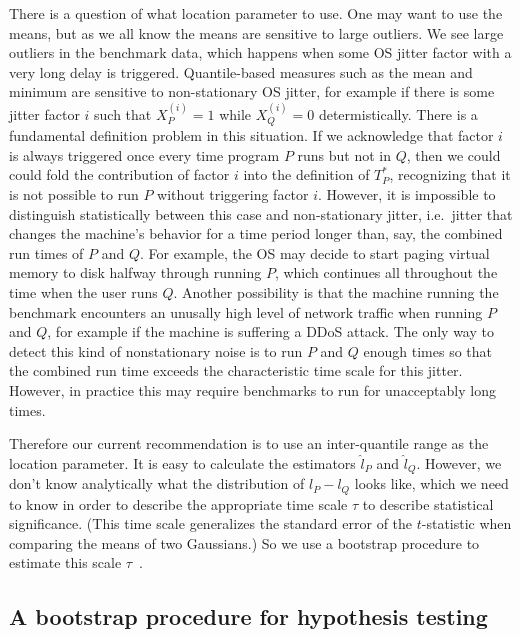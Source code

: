\documentclass[conference]{IEEEtran}
\begin{document}
There is a question of what location parameter to use.
One may want to use the means, but as we all know the means are sensitive to large outliers. We see large outliers in the benchmark data, which happens when some OS jitter factor with a very long delay is triggered. Quantile-based measures such as the mean and minimum are sensitive to non-stationary OS jitter, for example if there is some jitter factor $i$ such that $X^{(i)}_P = 1$ while $X^{(i)}_Q = 0$ determistically. There is a fundamental definition problem in this situation. If we acknowledge that factor $i$ is always triggered once every time program $P$ runs but not in $Q$, then we could could fold the contribution of factor $i$ into the definition of $T^*_P$, recognizing that it is not possible to run $P$ without triggering factor $i$. However, it is impossible to distinguish statistically between this case and non-stationary jitter, i.e.\ jitter that changes the machine's behavior for a time period longer than, say, the combined run times of $P$ and $Q$. For example, the OS may decide to start paging virtual memory to disk halfway through running $P$, which continues all throughout the time when the user runs $Q$. Another possibility is that the machine running the benchmark encounters an unusally high level of network traffic when running $P$ and $Q$, for example if the machine is suffering a DDoS attack. The only way to detect this kind of nonstationary noise is to run $P$ and $Q$ enough times so that the combined run time exceeds the characteristic time scale for this jitter. However, in practice this may require benchmarks to run for unacceptably long times.

Therefore our current recommendation is to use an inter-quantile range as the location parameter. It is easy to calculate the estimators $\hat l_P$ and $\hat l_Q$. However, we don't know analytically what the distribution of $l_P - l_Q$ looks like, which we need to know in order to describe the appropriate time scale $\tau$ to describe statistical significance. (This time scale generalizes the standard error of the $t$-statistic when comparing the means of two Gaussians.) So we use a bootstrap procedure to estimate this scale $\tau$~\cite{Efron1981}.

\subsection{A bootstrap procedure for hypothesis testing}

\end{document}
